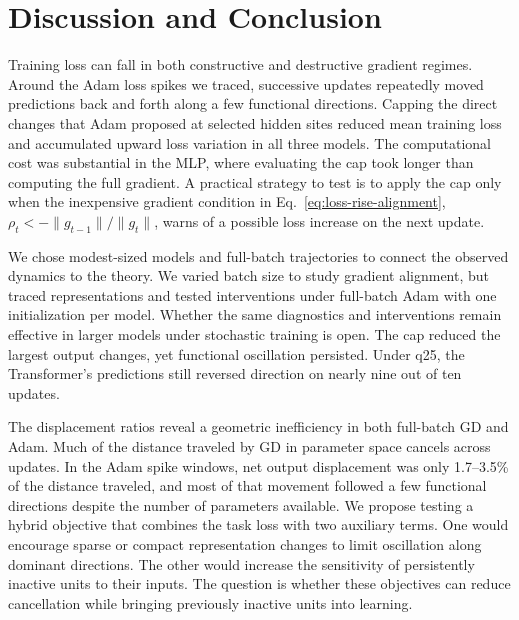 \section{Discussion and Conclusion}
\label{sec:conclusion}

Training loss can fall in both constructive and destructive gradient regimes. Around the Adam loss spikes we traced, successive updates repeatedly moved predictions back and forth along a few functional directions. Capping the direct changes that Adam proposed at selected hidden sites reduced mean training loss and accumulated upward loss variation in all three models. The computational cost was substantial in the MLP, where evaluating the cap took longer than computing the full gradient. A practical strategy to test is to apply the cap only when the inexpensive gradient condition in Eq.~\eqref{eq:loss-rise-alignment}, $\rho_t<-\|g_{t-1}\|/\|g_t\|$, warns of a possible loss increase on the next update.

We chose modest-sized models and full-batch trajectories to connect the observed dynamics to the theory. We varied batch size to study gradient alignment, but traced representations and tested interventions under full-batch Adam with one initialization per model. Whether the same diagnostics and interventions remain effective in larger models under stochastic training is open. The cap reduced the largest output changes, yet functional oscillation persisted. Under q25, the Transformer's predictions still reversed direction on nearly nine out of ten updates.

The displacement ratios reveal a geometric inefficiency in both full-batch GD and Adam. Much of the distance traveled by GD in parameter space cancels across updates. In the Adam spike windows, net output displacement was only 1.7--3.5\% of the distance traveled, and most of that movement followed a few functional directions despite the number of parameters available. We propose testing a hybrid objective that combines the task loss with two auxiliary terms. One would encourage sparse or compact representation changes to limit oscillation along dominant directions. The other would increase the sensitivity of persistently inactive units to their inputs. The question is whether these objectives can reduce cancellation while bringing previously inactive units into learning.
